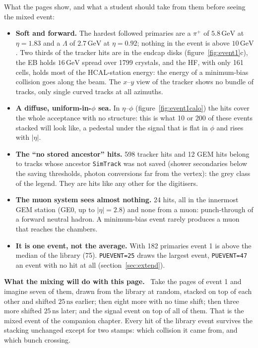 \documentclass[11pt,a4paper]{article}
\newcommand{\code}[1]{\texttt{#1}}
\newcommand{\GeV}{\,\mathrm{GeV}}
\newcommand{\ns}{\,\mathrm{ns}}
\newenvironment{plainwords}[1][In plain words]{%
  \par\medskip\noindent\setlength{\fboxsep}{6pt}\setlength{\fboxrule}{0.6pt}%
  \begin{lrbox}{\plainbox}\begin{minipage}{\dimexpr\textwidth-2\fboxsep-2\fboxrule\relax}\small
  \textbf{\textcolor{plainrule}{#1.}}\ \ignorespaces}{%
  \end{minipage}\end{lrbox}\noindent\fcolorbox{plainrule}{plainbg}{\usebox{\plainbox}}\par\medskip}
\begin{document}
What the pages show, and what a student should take from them before seeing the mixed event:
\begin{itemize}
\item \textbf{Soft and forward.} The hardest followed primaries are a $\pi^+$ of $5.8\GeV$ at $\eta=1.83$ and a
  $\Lambda$ of $2.7\GeV$ at $\eta=0.92$; nothing in the event is above $10\GeV$. Two thirds of the tracker
  hits are in the endcap disks (figure~\ref{fig:event1}c), the EB holds $16\GeV$ spread over 1799 crystals,
  and the HF, with only 161 cells, holds most of the HCAL-station energy: the energy of a minimum-bias
  collision goes along the beam. The $x$--$y$ view of the tracker shows no bundle of tracks, only single
  curved tracks at all azimuths.
\item \textbf{A diffuse, uniform-in-$\phi$ sea.} In $\eta$--$\phi$ (figure~\ref{fig:event1calo}) the hits
  cover the whole acceptance with no structure: this is what 10 or 200 of these events stacked will look
  like, a pedestal under the signal that is flat in $\phi$ and rises with $|\eta|$.
\item \textbf{The ``no stored ancestor'' hits.} 598 tracker hits and 12 GEM hits belong to tracks whose
  ancestor \code{SimTrack} was not saved (shower secondaries below the saving thresholds, photon conversions
  far from the vertex): the grey class of the legend. They are hits like any other for the digitisers.
\item \textbf{The muon system sees almost nothing.} 24 hits, all in the innermost GEM station (GE0, up to
  $|\eta|=2.8$) and none from a muon: punch-through of a forward neutral hadron. A minimum-bias event rarely
  produces a muon that reaches the chambers.
\item \textbf{It is one event, not the average.} With 182 primaries event 1 is above the median of the
  library (75). \code{PUEVENT=25} draws the largest event, \code{PUEVENT=47} an event with no hit at all
  (section~\ref{sec:extend}).
\end{itemize}

\begin{plainwords}[What the mixing will do with this page]
Take the pages of event 1 and imagine seven of them, drawn from the library at random, stacked on top of
each other and shifted $25\ns$ earlier; then eight more with no time shift; then three more shifted
$25\ns$ later; and the signal event on top of all of them. That is the mixed event of the companion chapter.
Every hit of the library event survives the stacking unchanged except for two stamps: which collision it
came from, and which bunch crossing.
\end{plainwords}
\end{document}
